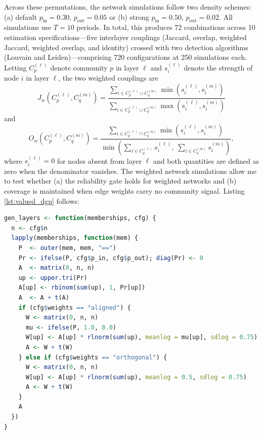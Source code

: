 \documentclass[11pt, letterpaper]{article}
\numberwithin{equation}{section}
\begin{document}
Across these permutations, the network simulations follow two density schemes: (a) default $p_{\mathrm{in}} = 0.30$, $p_{\mathrm{out}} = 0.05$ or (b) strong $p_{\mathrm{in}} = 0.50$, $p_{\mathrm{out}} = 0.02$. All simulations use $T = 10$ periods. In total, this produces 72 combinations across 10 estimation specifications---five interlayer couplings (Jaccard, overlap, weighted Jaccard, weighted overlap, and identity) crossed with two detection algorithms (Louvain and Leiden)---comprising 720 configurations at 250 simulations each. Letting $C_p^{(\ell)}$ denote community $p$ in layer $\ell$ and $s_i^{(\ell)}$ denote the strength of node $i$ in layer $\ell$, the two weighted couplings are
%
\begin{equation}
J_w\!\left(C_p^{(\ell)}, C_q^{(m)}\right) =
\frac{\sum_{i \in C_p^{(\ell)} \cup C_q^{(m)}} \min\!\left(s_i^{(\ell)}, s_i^{(m)}\right)}
     {\sum_{i \in C_p^{(\ell)} \cup C_q^{(m)}} \max\!\left(s_i^{(\ell)}, s_i^{(m)}\right)}
\label{eq:wjaccard}
\end{equation}
%
and
%
\begin{equation}
O_w\!\left(C_p^{(\ell)}, C_q^{(m)}\right) =
\frac{\sum_{i \in C_p^{(\ell)} \cap C_q^{(m)}} \min\!\left(s_i^{(\ell)}, s_i^{(m)}\right)}
     {\min\!\left(\sum_{i \in C_p^{(\ell)}} s_i^{(\ell)},\;
                  \sum_{i \in C_q^{(m)}} s_i^{(m)}\right)},
\label{eq:woverlap}
\end{equation}
%
where $s_i^{(\ell)} = 0$ for nodes absent from layer $\ell$ and both quantities are defined as zero when the denominator vanishes. The weighted network simulations allow me to test whether (a) the reliability gate holds for weighted networks and (b) coverage is maintained when edge weights carry no community signal. Listing \ref{lst:valued_dgp} follows:

\begin{singlespace}
\begin{lstlisting}[language=R,
  caption={Edges are Bernoulli draws from the
  planted partition; weights are lognormal and either aligned with block
  structure or orthogonal to it.},
  label={lst:valued_dgp}]
gen_layers <- function(memberships, cfg) {
  n <- cfg$n
  lapply(memberships, function(mem) {
    P  <- outer(mem, mem, "==")
    Pr <- ifelse(P, cfg$p_in, cfg$p_out); diag(Pr) <- 0
    A  <- matrix(0, n, n)
    up <- upper.tri(Pr)
    A[up] <- rbinom(sum(up), 1, Pr[up])
    A  <- A + t(A)
    if (cfg$weights == "aligned") {
      W <- matrix(0, n, n)
      mu <- ifelse(P, 1.0, 0.0)
      W[up] <- A[up] * rlnorm(sum(up), meanlog = mu[up], sdlog = 0.75)
      A <- W + t(W)
    } else if (cfg$weights == "orthogonal") {
      W <- matrix(0, n, n)
      W[up] <- A[up] * rlnorm(sum(up), meanlog = 0.5, sdlog = 0.75)
      A <- W + t(W)
    }
    A
  })
}
\end{lstlisting}
\end{singlespace}
\end{document}
